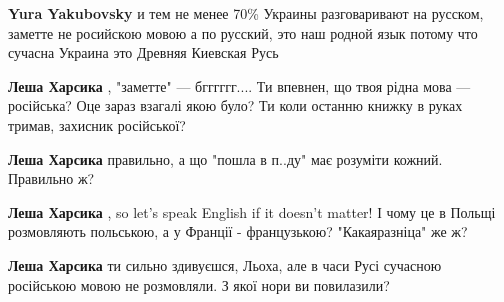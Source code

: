 \begin{itemize}
\begin{itemize}
 
\textbf{Yura Yakubovsky} и тем не менее 70\% Украины разговаривают на русском,
заметте не росийскою мовою а по русский, это наш родной язык потому что сучасна
Украина это Древняя Киевская Русь

 
\textbf{Леша Харсика} , "заметте" — бгггггг.... Ти впевнен, що твоя рідна мова
— російська? Оце зараз взагалі якою було? Ти коли останню книжку в руках
тримав, захисник російської?

 
\textbf{Леша Харсика} правильно, а що "пошла в п..ду" має розуміти кожний. Правильно ж?

 
\textbf{Леша Харсика} , so let's speak English if it doesn't matter! І чому це
в Польщі розмовляють польською, а у Франції - французькою? "Какаяразніца" же ж?

 
\textbf{Леша Харсика} ти сильно здивуєшся, Льоха, але в часи Русі сучасною
російською мовою не розмовляли. З якої нори ви повилазили?

 

\end{itemize}
\end{itemize}
